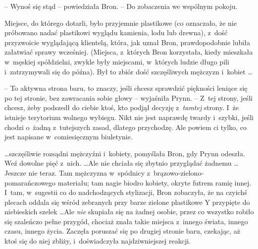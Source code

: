 \documentclass[oneside,polish,11pt,rmheadings]{mwbk}
\begin{document}
-- Wynoś się stąd -- powiedziała Bron. -- Do zobaczenia we wspólnym pokoju. 

Miejsce, do którego dotarli, było przyjemnie plastikowe (co oznaczało, że nie próbowano nadać plastikowi wyglądu kamienia, lodu lub drewna), z~dość przyzwoicie wyglądającą klientelą, która, jak uznał Bron, prawdopodobnie lubiła załatwiać sprawy wcześniej. (Miejsca, z~których Bron korzystała, kiedy mieszkała w~męskiej spółdzielni, zwykle były miejscami, w~których ludzie długo pili i~zatrzymywali się do późna). Był to zbiór dość szczęśliwych mężczyzn i~kobiet \ldots  

-- To aktywna strona baru, to znaczy, jeśli chcesz sprawdzić piękności leniące się po tej stronie, bez zawracania sobie głowy -- wyjaśniła Prynn. -- Z~tej strony, jeśli chcesz, żeby podszedł do ciebie ktoś, kto podjął decyzję z~\textit{tamtej }strony. I~że istnieje terytorium wolnego wybiegu. Nikt nie jest naprawdę twardy i~szybki, jeśli chodzi o~żadną z~tutejszych zasad, dlatego przychodzę. Ale powiem ci tylko, co jest napisane w~comiesięcznym biuletynie. 

 \ldots  szczęśliwie rozsądni mężczyźni i~kobiety, pomyślała Bron, gdy Prynn odeszła. Weź dowolne pięć z~nich.  \ldots  Ale nie chciała się zbytnio przyglądać żadnemu \ldots Jeszcze nie teraz. Tam mężczyzna w~spódnicy z~brązowo-zielono-pomarańczowego materiału; tam nagie biodro kobiety, okryte futrem ramię innej. I~tam, w~sugestii co do nadchodzących stylizacji, Bron zobaczyła, że na czyichś plecach oddala się wśród zebranych przy barze zielone plastikowe Y przypięte do niebieskich szelek \ldots   Ale \textit{nie }skupiała się na żadnej osobie, przez co wszystko robiło się szaleńczo pełne przygód, chociaż znała takie miejsca z~innego świata, innego czasu, innego życia. Zaczęła poruszać się po drugiej stronie baru, czekając, aż ktoś się do niej zbliży, i~doświadczyła najdziwniejszej reakcji. 
\end{document}
